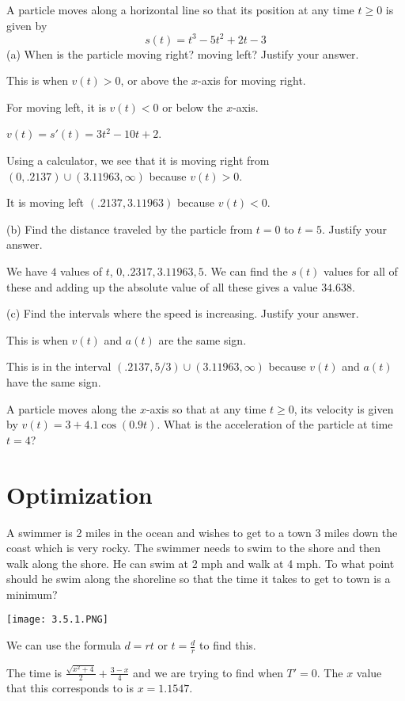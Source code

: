 \documentclass[../bccalc.tex]{subfiles}
\begin{document}
\pagebreak
\begin{example}
    A particle moves along a horizontal line so that its position at any time $t\geq 0$ is given by 
    \[ s(t)=t^3-5t^2+2t-3\]
    (a) When is the particle moving right? moving left? Justify your answer.

    This is when $v(t)>0$, or above the $x$-axis for moving right.

    For moving left, it is $v(t)<0$ or below the $x$-axis.

    $v(t)=s'(t)=3t^2-10t+2$.

    Using a calculator, we see that it is moving right from $(0,.2137)\cup (3.11963,\infty)$ because $v(t)>0$.

    It is moving left $(.2137,3.11963)$ because $v(t)<0$.

    (b) Find the distance traveled by the particle from $t=0$ to $t=5$. Justify your answer.

    We have $4$ values of $t$, $0,.2317,3.11963,5$. We can find the $s(t)$ values for all of these and adding up the absolute value of all these gives a value $34.638$.
    
    (c) Find the intervals where the speed is increasing. Justify your answer.

    This is when $v(t)$ and $a(t)$ are the same sign.

    This is in the interval $(.2137,5/3)\cup (3.11963,\infty)$ because $v(t)$ and $a(t)$ have the same sign. 
\end{example}

\ex A particle moves along the $x$-axis so that at any time $t\geq 0$, its velocity is given by $v(t)=3+4.1\cos(0.9t)$. What is the acceleration of the particle at time $t=4$?

\section{Optimization}
\begin{example}
    A swimmer is 2 miles in the ocean and wishes to get to a town 3 miles down the coast which is very rocky.
    The swimmer needs to swim to the shore and then walk along the shore. He can swim at 2 mph and walk at 4 mph. To what point should he swim along the shoreline so that the time it takes to get to town is a minimum?
    \begin{center}
        \texttt{[image: 3.5.1.PNG]}
    \end{center}
    We can use the formula $d=rt$ or $t=\frac{d}{r}$ to find this.

    The time is $\frac{\sqrt{x^2+4}}{2}+\frac{3-x}{4}$ and we are trying to find when $T'=0$. The $x$ value that this corresponds to is $x=1.1547$.    
\end{example}
\end{document}
